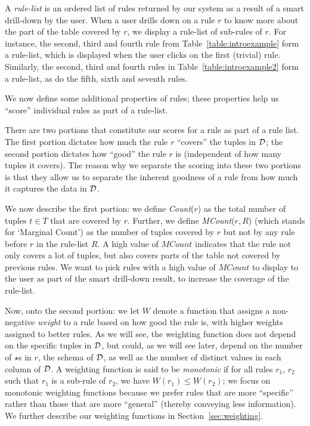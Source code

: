 A {\em rule-list} is an ordered list of rules returned by our system as a result of a smart drill-down by the user. 
When a user drills down on a rule $r$ to know more about the part of the table covered by $r$, we display a rule-list of sub-rules of $r$.
For instance, the second, third and fourth rule from Table~\ref{table:introexample} form a rule-list, which is displayed when the user clicks on the first (trivial) rule. Similarly, the second, third and fourth rules in Table~\ref{table:introexample2} form a rule-list, as do the fifth, sixth and seventh rules. 

 We now define some additional properties of rules; these properties
help us ``score'' individual rules as part of a rule-list. 

There are two portions that constitute our scores for a rule as part of a rule list. 
The first portion dictates how much the rule $r$ ``covers'' the tuples in $\mathcal{D}$;
the second portion dictates how ``good'' the rule $r$ is (independent of how many
tuples it covers). 
The reason why we separate the scoring into these two portions is
that they allow us to separate the inherent goodness of a rule from
how much it captures the data in $\mathcal{D}$.

We now describe the first portion:
we define {\em Count}($r$) as the total number of tuples $t \in T$ that are covered by $r$. 
Further, we define {\em MCount}($r, R$) (which stands for `Marginal Count') as the number of tuples covered by $r$ but not by any rule before $r$ in the rule-list $R$. A high value of $MCount$ indicates that the rule not only covers a lot of tuples, but also covers parts of the table not covered by previous rules. We want to pick rules with a high value of $MCount$ to display to the user
as part of the smart drill-down result, to increase the coverage of the rule-list. 

Now, onto the second portion: we let $W$ denote a function that assigns a non-negative {\em weight} to a rule based on how good the rule is, with higher weights assigned to better rules. 
As we will see, the weighting function does not depend on the specific
tuples in $\mathcal{D}$, but could, as we will see later, 
depend on the number of $\star$s in $r$,
the schema of $\mathcal{D}$, 
as well as the number of distinct values in each column of $\mathcal{D}$.
A weighting function is said to be {\em monotonic} if for all rules $r_1$, $r_2$ such that $r_1$ is a sub-rule of $r_2$, we have $W(r_1) \leq W(r_2)$; we focus
on monotonic weighting functions because we prefer 
rules that are more ``specific''
rather than those that are more ``general'' 
(thereby conveying less information).
We further describe our weighting functions in Section~\ref{sec:weighting}. 

